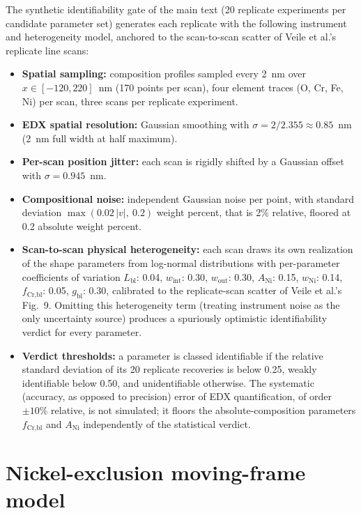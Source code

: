 The synthetic identifiability gate of the main text (20 replicate
experiments per candidate parameter set) generates each replicate with
the following instrument and heterogeneity model, anchored to the
scan-to-scan scatter of Veile et al.'s replicate line scans:
\begin{itemize}
\item \textbf{Spatial sampling:} composition profiles sampled every
2~nm over $x \in [-120, 220]$~nm (170 points per scan), four element
traces (O, Cr, Fe, Ni) per scan, three scans per replicate experiment.
\item \textbf{EDX spatial resolution:} Gaussian smoothing with
$\sigma = 2/2.355 \approx 0.85$~nm (2~nm full width at half maximum).
\item \textbf{Per-scan position jitter:} each scan is rigidly shifted
by a Gaussian offset with $\sigma = 0.945$~nm.
\item \textbf{Compositional noise:} independent Gaussian noise per
point, with standard deviation $\max(0.02\,|v|,\ 0.2)$ weight
percent, that is 2\% relative, floored at 0.2 absolute weight
percent.
\item \textbf{Scan-to-scan physical heterogeneity:} each scan draws its
own realization of the shape parameters from log-normal distributions
with per-parameter coefficients of variation $L_\mathrm{bl}$: 0.04,
$w_\text{int}$: 0.30, $w_\text{out}$: 0.30, $A_\text{Ni}$: 0.15,
$w_\text{Ni}$: 0.14, $f_\text{Cr,bl}$: 0.05, $g_\mathrm{bl}$: 0.30,
calibrated to the replicate-scan scatter of Veile et al.'s Fig.~9.
Omitting this heterogeneity term (treating instrument noise as the only
uncertainty source) produces a spuriously optimistic identifiability
verdict for every parameter.
\item \textbf{Verdict thresholds:} a parameter is classed identifiable
if the relative standard deviation of its 20 replicate recoveries is
below 0.25, weakly identifiable below 0.50, and unidentifiable
otherwise. The systematic (accuracy, as opposed to precision) error of
EDX quantification, of order $\pm10\%$ relative, is not simulated; it
floors the absolute-composition parameters $f_\text{Cr,bl}$ and
$A_\text{Ni}$ independently of the statistical verdict.
\end{itemize}

\section{Nickel-exclusion moving-frame model}
\label{sec:ni-model}

